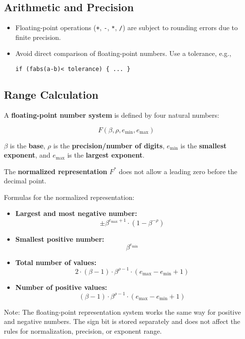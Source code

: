 \subsection{Arithmetic and Precision}
\begin{itemize}
    \item Floating-point operations (\lstinline[style=CodeExpert]{+}, \lstinline[style=CodeExpert]{-}, \lstinline[style=CodeExpert]{*}, \lstinline[style=CodeExpert]{/}) are subject to rounding errors due to finite precision.
    \item Avoid direct comparison of floating-point numbers. Use a tolerance, e.g.,
    \begin{lstlisting}[style=codeexpert]
    if (fabs(a-b)< tolerance) { ... }
    \end{lstlisting}
\end{itemize}

\subsection{Range Calculation}
A \textbf{floating-point number system} is defined by four natural numbers:

\[
F(\beta, \rho, e_{\text{min}}, e_{\text{max}})
\]


\(\beta\) is the \textbf{base}, \(\rho\) is the \textbf{precision/number of digits}, \(e_{\text{min}}\) is the \textbf{smallest exponent}, and \(e_{\text{max}}\) is the \textbf{largest exponent}.

The \textbf{normalized representation} \(F^*\) does not allow a leading zero before the decimal point.

Formulas for the normalized representation:

\begin{itemize}
    \item \textbf{Largest and most negative number:} 
    \[
    \pm \beta^{e_{\text{max}} + 1} \cdot (1 - \beta^{-\rho})
    \]
    \item \textbf{Smallest positive number:} 
    \[
    \beta^{e_{\text{min}}}
    \]
    \item \textbf{Total number of values:} 
    \[
    2 \cdot (\beta - 1) \cdot \beta^{\rho - 1} \cdot (e_{\text{max}} - e_{\text{min}} + 1)
    \]
    \item \textbf{Number of positive values:} 
    \[
    (\beta - 1) \cdot \beta^{\rho - 1} \cdot (e_{\text{max}} - e_{\text{min}} + 1)
    \]
\end{itemize}
Note: The floating-point representation system works the same way for positive and negative numbers. The sign bit is stored separately and does not affect the rules for normalization, precision, or exponent range.


